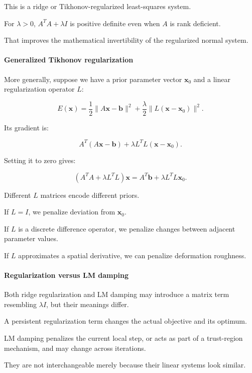 This is a ridge or Tikhonov-regularized least-squares system.

For \(\lambda>0\), \(A^TA+\lambda I\) is positive definite even when \(A\) is rank deficient.

That improves the mathematical invertibility of the regularized normal system.

\paragraph{Generalized Tikhonov regularization}\label{02-foundations-ii-ch027-generalized-tikhonov-regularization}

More generally, suppose we have a prior parameter vector \(\mathbf x_0\) and a linear regularization operator \(L\):

\[
E(\mathbf x)= \frac12\|A\mathbf x-\mathbf b\|^2+ \frac\lambda2\|L(\mathbf x-\mathbf x_0)\|^2.
\]

Its gradient is:

\[
A^T(A\mathbf x-\mathbf b)+ \lambda L^TL(\mathbf x-\mathbf x_0).
\]

Setting it to zero gives:

\[
\boxed{ (A^TA+\lambda L^TL)\mathbf x = A^T\mathbf b+\lambda L^TL\mathbf x_0 }.
\]

Different \(L\) matrices encode different priors.

If \(L=I\), we penalize deviation from \(\mathbf x_0\).

If \(L\) is a discrete difference operator, we penalize changes between adjacent parameter values.

If \(L\) approximates a spatial derivative, we can penalize deformation roughness.

\paragraph{Regularization versus LM damping}\label{02-foundations-ii-ch027-regularization-versus-lm-damping}

Both ridge regularization and LM damping may introduce a matrix term resembling \(\lambda I\), but their meanings differ.

A persistent regularization term changes the actual objective and its optimum.

LM damping penalizes the current local step, or acts as part of a trust-region mechanism, and may change across iterations.

They are not interchangeable merely because their linear systems look similar.


